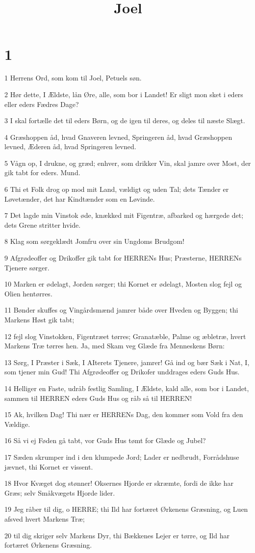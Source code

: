 

\title{Joel}


\chapter{1}

\par 1 Herrens Ord, som kom til Joel, Petuels søn.
\par 2 Hør dette, I Ældste, lån Øre, alle, som bor i Landet! Er sligt mon sket i eders eller eders Fædres Dage?
\par 3 I skal fortælle det til eders Børn, og de igen til deres, og deles til næste Slægt.
\par 4 Græshoppen åd, hvad Gnaveren levned, Springeren åd, hvad Græshoppen levned, Æderen åd, hvad Springeren levned.
\par 5 Vågn op, I drukne, og græd; enhver, som drikker Vin, skal jamre over Most, der gik tabt for eders. Mund.
\par 6 Thi et Folk drog op mod mit Land, vældigt og uden Tal; dets Tænder er Løvetænder, det har Kindtænder som en Løvinde.
\par 7 Det lagde min Vinstok øde, knækked mit Figentræ, afbarked og hærgede det; dets Grene stritter hvide.
\par 8 Klag som sørgeklædt Jomfru over sin Ungdoms Brudgom!
\par 9 Afgrødeoffer og Drikoffer gik tabt for HERRENs Hus; Præsterne, HERRENs Tjenere sørger.
\par 10 Marken er ødelagt, Jorden sørger; thi Kornet er ødelagt, Mosten slog fejl og Olien hentørres.
\par 11 Bønder skuffes og Vingårdsmænd jamrer både over Hveden og Byggen; thi Markens Høst gik tabt;
\par 12 fejl slog Vinstokken, Figentræet tørres; Granatæble, Palme og æbletræ, hvert Markens Træ tørres hen. Ja, med Skam veg Glæde fra Menneskens Børn:
\par 13 Sørg, I Præster i Sæk, I AIterets Tjenere, jamrer! Gå ind og bær Sæk i Nat, I, som tjener min Gud! Thi Afgrødeoffer og Drikofer unddrages eders Guds Hus.
\par 14 Helliger en Faste, udråb festlig Samling, I Ældste, kald alle, som bor i Landet, sammen til HERREN eders Guds Hus og råb så til HERREN!
\par 15 Ak, hvilken Dag! Thi nær er HERRENs Dag, den kommer som Vold fra den Vældige.
\par 16 Så vi ej Føden gå tabt, vor Guds Hus tømt for Glæde og Jubel?
\par 17 Sæden skrumper ind i den klumpede Jord; Lader er nedbrudt, Forrådshuse jævnet, thi Kornet er vissent.
\par 18 Hvor Kvæget dog stønner! Oksernes Hjorde er skræmte, fordi de ikke har Græs; selv Småkvægets Hjorde lider.
\par 19 Jeg råber til dig, o HERRE; thi Ild har fortæret Ørkenens Græsning, og Luen afsved hvert Markens Træ;
\par 20 til dig skriger selv Markens Dyr, thi Bækkenes Lejer er tørre, og Ild har fortæret Ørkenens Græsning.

